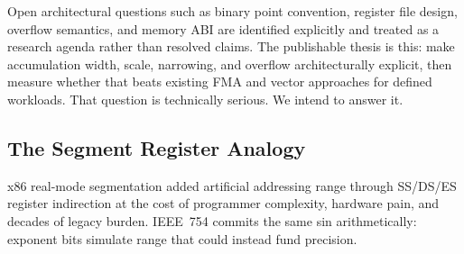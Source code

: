\documentclass[runningheads]{llncs}
\begin{document}
Open architectural questions such as binary point convention, register
file design, overflow semantics, and memory ABI are identified explicitly
and treated as a research agenda rather than resolved claims. The
publishable thesis is this: make accumulation width, scale, narrowing,
and overflow architecturally explicit, then measure whether that beats
existing FMA and vector approaches for defined workloads. That question
is technically serious. We intend to answer it.

\subsection{The Segment Register Analogy}

x86 real-mode segmentation added artificial addressing range through
SS/DS/ES register indirection at the cost of programmer complexity,
hardware pain, and decades of legacy burden. IEEE~754 commits the same
sin arithmetically: exponent bits simulate range that could instead fund
precision.
\end{document}
